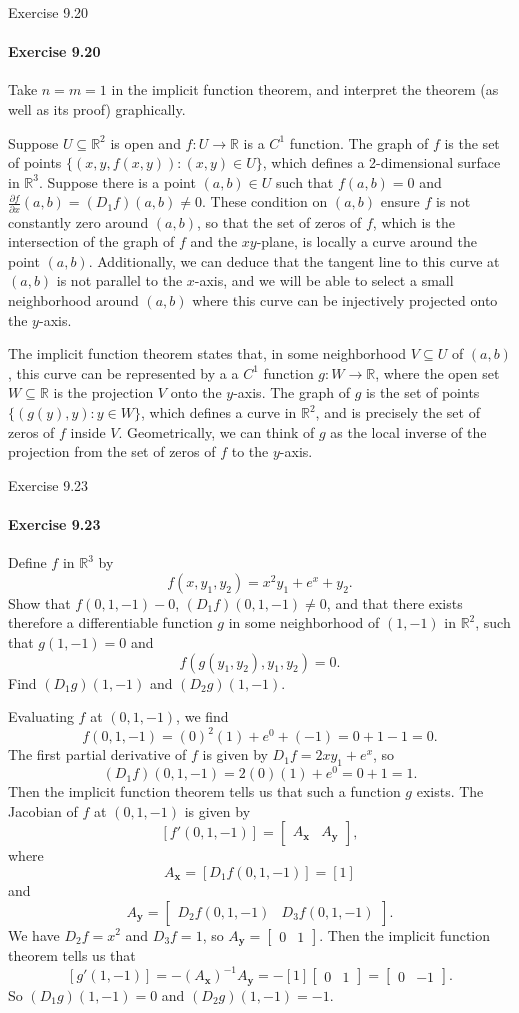 \documentclass[12pt]{article}
\newenvironment{fullbox}{\begin{lrbox}{\savefullbox}\begin{minipage}{\dimexpr\textwidth-2\fboxsep\relax}}{\end{minipage}\end{lrbox}\begin{center}\framebox[\textwidth]{\usebox{\savefullbox}}\end{center}}
\newenvironment{pbox}[1][]{\begin{fullbox}\ifx#1\empty\else\paragraph{#1}\fi}{\end{fullbox}}
\theoremstyle{definition}
\newcommand{\R}{\mathbb{R}}
\newcommand{\pdv}[2]{\frac{\partial #1}{\partial #2}}
\newcommand{\mat}[1]{\begin{bmatrix}#1\end{bmatrix}}
\begin{document}
\newpage
\begin{pbox}[Exercise 9.20]
    Take $n = m = 1$ in the implicit function theorem, and interpret the theorem (as well as its proof) graphically.
\end{pbox}

Suppose $U \subseteq \R^2$ is open and $f : U \to \R$ is a $C^1$ function. The graph of $f$ is the set of points $\{(x, y, f(x, y)) : (x, y) \in U\}$, which defines a 2-dimensional surface in $\R^3$. Suppose there is a point $(a, b) \in U$ such that $f(a, b) = 0$ and $\pdv{f}{x}(a, b) = (D_1f)(a, b) \ne 0$. These condition on $(a, b)$ ensure $f$ is not constantly zero around $(a, b)$, so that the set of zeros of $f$, which is the intersection of the graph of $f$ and the $xy$-plane, is locally a curve around the point $(a, b)$. Additionally, we can deduce that the tangent line to this curve at $(a, b)$ is not parallel to the $x$-axis, and we will be able to select a small neighborhood around $(a, b)$ where this curve can be injectively projected onto the $y$-axis.

The implicit function theorem states that, in some neighborhood $V \subseteq U$ of $(a, b)$, this curve can be represented by a a $C^1$ function $g : W \to \R$, where the open set $W \subseteq \R$ is the projection $V$ onto the $y$-axis. The graph of $g$ is the set of points $\{(g(y), y) : y \in W\}$, which defines a curve in $\R^2$, and is precisely the set of zeros of $f$ inside $V$. Geometrically, we can think of $g$ as the local inverse of the projection from the set of zeros of $f$ to the $y$-axis.





\newpage
\begin{pbox}[Exercise 9.23]
    Define $f$ in $\R^3$ by
    \[
        f(x, y_1, y_2) = x^2y_1 + e^x + y_2.
    \]
    Show that $f(0, 1, -1) - 0$, $(D_1f)(0, 1, -1) \ne 0$, and that there exists therefore a differentiable function $g$ in some neighborhood of $(1, -1)$ in $\R^2$, such that $g(1, -1) = 0$ and
    \[
        f(g(y_1, y_2), y_1, y_2) = 0.
    \]
    Find $(D_1g)(1, -1)$ and $(D_2g)(1, -1)$.
\end{pbox}

Evaluating $f$ at $(0, 1, -1)$, we find
\[
    f(0, 1, -1)
        = (0)^2(1) + e^0 + (-1)
        = 0 + 1 - 1
        = 0.
\]
The first partial derivative of $f$ is given by $D_1f = 2xy_1 + e^x$, so
\[
    (D_1f)(0, 1, -1) = 2(0)(1) + e^0 = 0 + 1 = 1.
\]
Then the implicit function theorem tells us that such a function $g$ exists. The Jacobian of $f$ at $(0, 1, -1)$ is given by
\[
    [f'(0, 1, -1)] = \mat{A_{\mathbf{x}} & A_{\mathbf{y}}},
\]
where
\[
    A_{\mathbf{x}} = [D_1f(0, 1, -1)] = [1]
\]
and
\[
    A_{\mathbf{y}} = \mat{D_2f(0, 1, -1) & D_3f(0, 1, -1)}.
\]
We have $D_2f = x^2$ and $D_3f = 1$, so $A_{\mathbf{y}} = \mat{0 & 1}$. Then the implicit function theorem tells us that
\[
    [g'(1, -1)]
        = -(A_{\mathbf{x}})^{-1}A_{\mathbf{y}}
        = -[1]\mat{0 & 1}
        = \mat{0 & -1}.
\]
So $(D_1g)(1, -1) = 0$ and $(D_2g)(1, -1) = -1$.
\end{document}
